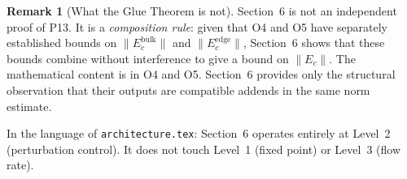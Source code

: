 \documentclass[12pt,a4paper]{amsart}
\theoremstyle{definition}
\newtheorem{remark}[theorem]{Remark}
\newcommand{\Ec}{E_c}
\newcommand{\norm}[1]{\|#1\|}
\begin{document}
\begin{remark}[What the Glue Theorem is not]
Section~6 is not an independent proof of P13.
It is a \emph{composition rule}: given that O4 and O5 have separately
established bounds on $\norm{\Ec^{\mathrm{bulk}}}$ and $\norm{\Ec^{\mathrm{edge}}}$,
Section~6 shows that these bounds combine without interference
to give a bound on $\norm{\Ec}$.
The mathematical content is in O4 and O5.
Section~6 provides only the structural observation that their outputs
are compatible addends in the same norm estimate.

In the language of \texttt{architecture.tex}:
Section~6 operates entirely at Level~2 (perturbation control).
It does not touch Level~1 (fixed point) or Level~3 (flow rate).
\end{remark}
\end{document}
